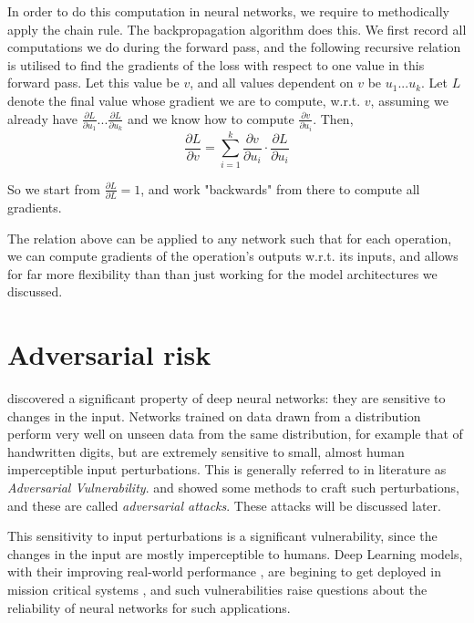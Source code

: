 \documentclass[12pt, oneside]{book}
\begin{document}
In order to do this computation in neural networks, we require to methodically
apply the chain rule. The backpropagation algorithm does this. We first record
all computations we do during the forward pass, and the following recursive
relation is utilised to find the gradients of the loss with respect to one value
in this forward pass. Let this value be $v$, and all values dependent on $v$ be
$u_1... u_k$. Let $L$ denote the final value whose gradient we are to compute,
w.r.t. $v$, assuming we already have $\frac{\partial L}{\partial u_1}...
\frac{\partial L}{\partial u_k}$ and we know how to compute $\frac{\partial
v}{\partial u_i}$. Then,
\begin{equation*}
    \frac{\partial L}{\partial v} = \sum_{i=1}^k {\frac{\partial
v}{\partial u_i}\cdot \frac{\partial L}{\partial u_i}}
\end{equation*}

So we start from $\frac{\partial L}{\partial L}=1$, and work "backwards" from
there to compute all gradients.

The relation above can be applied to any network such that for each operation,
we can compute gradients of the operation's outputs w.r.t. its inputs, and
allows for far more flexibility than than just working for the model
architectures we discussed.

\section{Adversarial risk}

\citet{42503} discovered a significant property of deep neural networks: they
are sensitive to changes in the input. Networks trained on data drawn from a
distribution perform very well on unseen data from the same distribution, for
example that of handwritten digits, but are extremely sensitive to small, almost
human imperceptible input perturbations. This is generally referred to in
literature as \emph{Adversarial Vulnerability}.
\citep{Goodfellow2015ExplainingAH} and \citep{madry2019deep} showed some methods
to craft such perturbations, and these are called \emph{adversarial attacks}.
These attacks will be discussed later.

This sensitivity to input perturbations is a significant vulnerability, since
the changes in the input are mostly imperceptible to humans. Deep Learning
models, with their improving real-world performance
\citep{imagenet,imagenet-superhuman}, are begining to get deployed in mission
critical systems \citep{adv-vuln-in-mission-critical}, and such vulnerabilities
raise questions about the reliability of neural networks for such applications.
\end{document}
